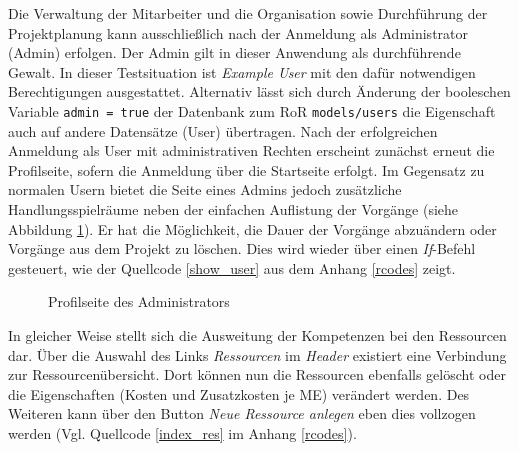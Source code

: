 \documentclass[a4paper,12pt,parskip,bibtotoc,liststotoc]{article}
\begin{document}
Die Verwaltung der Mitarbeiter und die Organisation sowie Durchführung der Projektplanung kann ausschließlich nach der Anmeldung als Administrator (Admin) erfolgen. Der Admin gilt in dieser Anwendung als durchführende Gewalt. In dieser Testsituation ist \textit{Example User} mit den dafür notwendigen Berechtigungen ausgestattet. Alternativ lässt sich durch Änderung der booleschen Variable \texttt{admin = true} der Datenbank zum RoR \texttt{models/users} die Eigenschaft auch auf andere Datensätze (User) übertragen. Nach der erfolgreichen Anmeldung als User mit administrativen Rechten erscheint zunächst erneut die Profilseite, sofern die Anmeldung über die Startseite erfolgt. Im Gegensatz zu normalen Usern bietet die Seite eines Admins jedoch zusätzliche Handlungsspielräume neben der einfachen Auflistung der Vorgänge (siehe Abbildung \ref{ProAd}). Er hat die Möglichkeit, die Dauer der Vorgänge abzuändern oder Vorgänge aus dem Projekt zu löschen. Dies wird wieder über einen \textit{If}-Befehl gesteuert, wie der Quellcode \ref{show_user} aus dem Anhang \ref{rcodes} zeigt.\\

\begin{figure}[h!]
  \begin{center}
    \caption{Profilseite des Administrators}  \label{ProAd}
  \end{center}
\end{figure}       

In gleicher Weise stellt sich die Ausweitung der Kompetenzen bei den Ressourcen dar. Über die Auswahl des Links \textit{Ressourcen} im \textit{Header} existiert eine Verbindung zur Ressourcenübersicht. Dort können nun die Ressourcen ebenfalls gelöscht oder die Eigenschaften (Kosten und Zusatzkosten je ME) verändert werden. Des Weiteren kann über den Button \textit{Neue Ressource anlegen} eben dies vollzogen werden (Vgl. Quellcode \ref{index_res} im Anhang \ref{rcodes}).\\      
\end{document}
